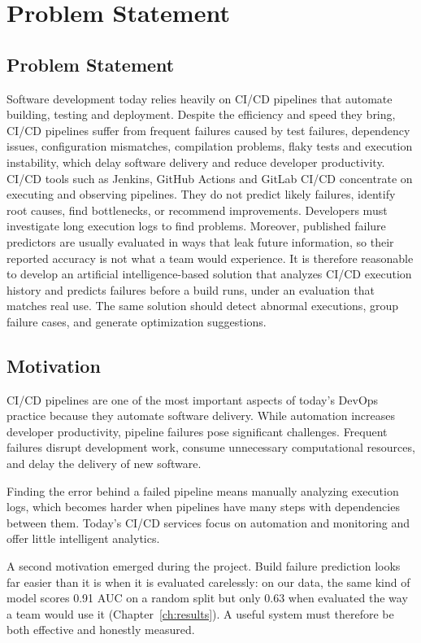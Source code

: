\chapter{Problem Statement}
\label{ch:problem}

\section{Problem Statement}
\label{sec:problem}
Software development today relies heavily on CI/CD pipelines that automate building, testing and deployment. Despite the efficiency and speed they bring, CI/CD pipelines suffer from frequent failures caused by test failures, dependency issues, configuration mismatches, compilation problems, flaky tests and execution instability, which delay software delivery and reduce developer productivity. CI/CD tools such as Jenkins, GitHub Actions and GitLab CI/CD concentrate on executing and observing pipelines. They do not predict likely failures, identify root causes, find bottlenecks, or recommend improvements. Developers must investigate long execution logs to find problems. Moreover, published failure predictors are usually evaluated in ways that leak future information, so their reported accuracy is not what a team would experience. It is therefore reasonable to develop an artificial intelligence-based solution that analyzes CI/CD execution history and predicts failures before a build runs, under an evaluation that matches real use. The same solution should detect abnormal executions, group failure cases, and generate optimization suggestions.

\section{Motivation}
\label{sec:motivation}
CI/CD pipelines are one of the most important aspects of today's DevOps practice because they automate software delivery. While automation increases developer productivity, pipeline failures pose significant challenges. Frequent failures disrupt development work, consume unnecessary computational resources, and delay the delivery of new software.

Finding the error behind a failed pipeline means manually analyzing execution logs, which becomes harder when pipelines have many steps with dependencies between them. Today's CI/CD services focus on automation and monitoring and offer little intelligent analytics.

A second motivation emerged during the project. Build failure prediction looks far easier than it is when it is evaluated carelessly: on our data, the same kind of model scores 0.91 AUC on a random split but only 0.63 when evaluated the way a team would use it (Chapter~\ref{ch:results}). A useful system must therefore be both effective and honestly measured.


